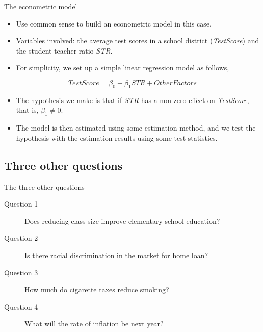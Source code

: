 \documentclass[presentation]{beamer}
\begin{document}
\begin{frame}[label={sec:orga9d0a0c}]{The econometric model}
\begin{itemize}
\item Use common sense to build an econometric model in this case.
\item Variables involved: the average test scores in a school district
(\emph{TestScore}) and the student-teacher ratio \emph{STR}.
\item For simplicity, we set up a \alert{simple linear regression
model} as follows,
\end{itemize}

\[ TestScore = \beta_0 + \beta_1 STR + OtherFactors  \]

\begin{itemize}
\item The hypothesis we make is that if \emph{STR} has a non-zero effect on
\emph{TestScore}, that is, \(\beta_1 \neq 0\).

\item The model is then estimated using some estimation method, and we
test the hypothesis with the estimation results using some test
statistics.
\end{itemize}
\end{frame}


\subsection*{Three other questions}
\label{sec:org11c4995}

\begin{frame}[label={sec:orga0eba84}]{The three other questions}
\begin{description}
\item[{Question 1}] Does reducing class size improve elementary school education?
\item[{Question 2}] Is there racial discrimination in the market for home loan?
\item[{Question 3}] How much do cigarette taxes reduce smoking?
\item[{Question 4}] What will the rate of inflation be next year?
\end{description}
\end{frame}
\end{document}
